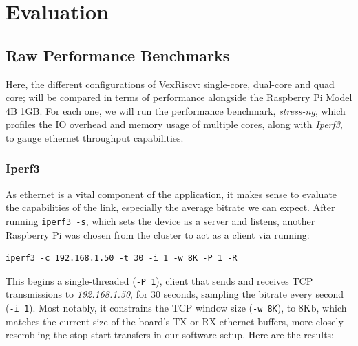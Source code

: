 \chapter[Evaluation]{Evaluation}
\label{Chap:Evaluation}

\section{Raw Performance Benchmarks}
Here, the different configurations of VexRiscv: single-core, dual-core and quad core; will be compared in terms of performance alongside the Raspberry Pi Model 4B 1GB. For each one, we will run the performance benchmark, \textit{stress-ng}, which profiles the IO overhead and memory usage of multiple cores, along with \textit{Iperf3}, to gauge ethernet throughput capabilities.

\subsection{Iperf3}
As ethernet is a vital component of the application, it makes sense to evaluate the capabilities of the link, especially the average bitrate we can expect. After running \texttt{iperf3 -s}, which sets the device as a server and listens, another Raspberry Pi was chosen from the cluster to act as a client via running:
\begin{verbatim}    
iperf3 -c 192.168.1.50 -t 30 -i 1 -w 8K -P 1 -R
\end{verbatim}
This begins a single-threaded (\texttt{-P 1}), client that sends and receives TCP transmissions to \textit{192.168.1.50}, for 30 seconds, sampling the bitrate every second (\texttt{-i 1}). Most notably, it constrains the TCP window size (\texttt{-w 8K}), to 8Kb, which matches the current size of the board's TX or RX ethernet buffers, more closely resembling the stop-start transfers in our software setup. Here are the results:

